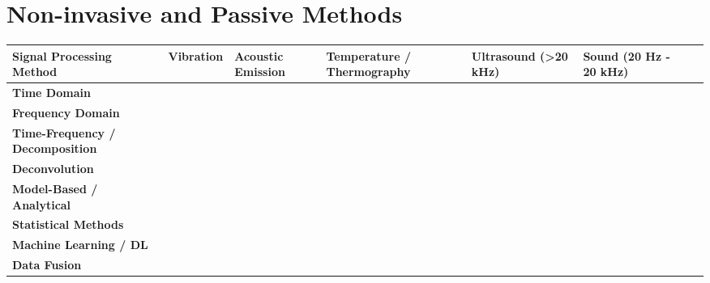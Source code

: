 \section{Non-invasive and Passive Methods}
\begin{table}[!h]
\scriptsize
\centering
\renewcommand{\arraystretch}{1.3}
\setlength{\tabcolsep}{4pt}

\begin{tabularx}{\linewidth}{| 
>{\raggedright\arraybackslash}p{2cm}
| X | X | X | X | X | X | X}

\hline
\textbf{Signal Processing Method}
& \textbf{Vibration}
& \textbf{Acoustic Emission}
& \textbf{Temperature / Thermography}
& \textbf{Ultrasound (\textgreater 20 kHz)}
& \textbf{Sound (20 Hz - 20 kHz)}
\\
\hline

\textbf{Time Domain}
& \cite{jakobsen_detecting_2023} \cite{zhang_graph-data-based_2024} \cite{tandon_condition_2007} \cite{cornel_condition_2021} \cite{jakobsen_vibration_2021} \cite{xu_vibration-based_2024} \cite{jakobsen_low_2024} \cite{wang_advanced_2024}
& \cite{zhang_graph-data-based_2024} \cite{miettinen_analysis_2001} \cite{tandon_condition_2007} \cite{cornel_condition_2021} \cite{kestel_condition_2025} \cite{hou_-situ_2025} \cite{delft_university_of_technology_tu_delft_influence_2024} \cite{marticorena_rolling_2022} \cite{wang_advanced_2024}
& \cite{zhang_graph-data-based_2024} \cite{moussa_passive_2017} \cite{cen_film_2019} \cite{wang_advanced_2024}
& \cite{jakobsen_detecting_2023} \cite{jakobsen_low_2024} \cite{lineham_ultrasonic_2008}
&
\\
\hline
\textbf{Frequency Domain}
& \cite{zhang_graph-data-based_2024} \cite{jakobsen_vibration_2021} \cite{xu_vibration-based_2024} \cite{jakobsen_low_2024}
& \cite{zhang_graph-data-based_2024} \cite{kestel_condition_2025} \cite{marticorena_rolling_2022}
& \cite{zhang_graph-data-based_2024}
& \cite{jakobsen_low_2024}
& \cite{georgiev_microphone_2017}
\\
\hline
\textbf{Time-Frequency / Decomposition}
& \cite{jakobsen_vibration_2021}
& \cite{kestel_condition_2025}
& 
&
&
\\
\hline
\textbf{Deconvolution}
& \cite{xu_vibration-based_2024}
&
&
&
&
\\
\hline
\textbf{Model-Based / Analytical}
&
&
& \cite{moussa_passive_2017}
&
&
\\
\hline
\textbf{Statistical Methods}
& \cite{scheeren_acoustic_2024}
&
&
&
&
\\
\hline
\textbf{Machine Learning / DL}
& \cite{zhang_graph-data-based_2024} \cite{wang_advanced_2024}
& \cite{zhang_graph-data-based_2024} \cite{kestel_condition_2025} \cite{wang_advanced_2024}
& \cite{zhang_graph-data-based_2024} \cite{wang_advanced_2024}
&
&
\\
\hline
\textbf{Data Fusion}
& \cite{zhang_graph-data-based_2024}
& \cite{zhang_graph-data-based_2024}
& \cite{zhang_graph-data-based_2024}
&
&
\\
\hline



\end{tabularx}
\end{table}
